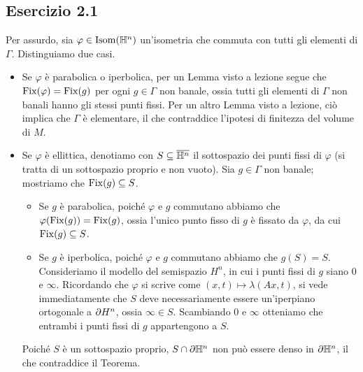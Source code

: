 \subsection*{Esercizio 2.1}
Per assurdo, sia $\varphi\in\operatorname{Isom}(\mathbb{H}^n)$ un'isometria che commuta con tutti gli elementi di $\Gamma$. Distinguiamo due casi.
\begin{itemize}
\item Se $\varphi$ è parabolica o iperbolica, per un Lemma visto a lezione segue che $\operatorname{Fix}(\varphi)=\operatorname{Fix}(g)$ per ogni $g\in\Gamma$ non banale, ossia tutti gli elementi di $\Gamma$ non banali hanno gli stessi punti fissi. Per un altro Lemma visto a lezione, ciò implica che $\Gamma$ è elementare, il che contraddice l'ipotesi di finitezza del volume di $M$.
\item Se $\varphi$ è ellittica, denotiamo con $S\subseteq\overline{\mathbb{H}^n}$ il sottospazio dei punti fissi di $\varphi$ (si tratta di un sottospazio proprio e non vuoto). Sia $g\in\Gamma$ non banale; mostriamo che $\operatorname{Fix}(g)\subseteq S$.
\begin{itemize}
\item Se $g$ è parabolica, poiché $\varphi$ e $g$ commutano abbiamo che $\varphi(\operatorname{Fix}(g))=\operatorname{Fix}(g)$, ossia l'unico punto fisso di $g$ è fissato da $\varphi$, da cui $\operatorname{Fix}(g)\subseteq S$.
\item Se $g$ è iperbolica, poiché $\varphi$ e $g$ commutano abbiamo che $g(S)=S$. Consideriamo il modello del semispazio $H^n$, in cui i punti fissi di $g$ siano $0$ e $\infty$. Ricordando che $\varphi$ si scrive come $(x,t)\mapsto\lambda(Ax,t)$, si vede immediatamente che $S$ deve necessariamente essere un'iperpiano ortogonale a $\partial H^n$, ossia $\infty\in S$. Scambiando $0$ e $\infty$ otteniamo che entrambi i punti fissi di $g$ appartengono a $S$.
\end{itemize}
Poiché $S$ è un sottospazio proprio, $S\cap\partial\mathbb{H}^n$ non può essere denso in $\partial\mathbb{H}^n$, il che contraddice il Teorema.
\end{itemize}

